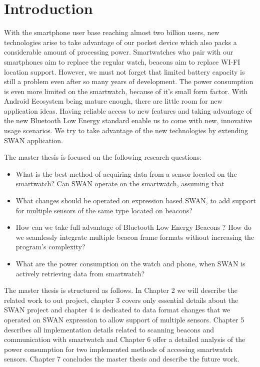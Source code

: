 
\chapter{Introduction} %

\label{Chapter1} %


With the smartphone user base reaching almost two billion users, new technologies arise to take advantage of our pocket device which also packs a considerable amount of processing power.
Smartwatches who pair with our smartphones aim to replace the regular watch, beacons aim to replace WI-FI location support. 
However, we must not forget that limited battery capacity is still a problem even after so many years of development. The power consumption is even more limited on the smartwatch, because of
it's small form factor.
With Android Ecosystem being mature enough, there are little room for new application ideas. Having reliable access to new features and taking advantage of the new Bluetooth Low Energy standard
enable us to come with new, innovative usage scenarios. We try to take advantage of the new technologies by extending SWAN application.

The master thesis is focused on the following research questions:

\begin{itemize}
 \item What is the best method of acquiring data from a sensor located on the smartwatch? Can SWAN operate on the smartwatch, assuming that 
 \item What changes should be operated on expression based SWAN, to add support for multiple sensors of the same type located on beacons?
 \item How can we take full advantage of Bluetooth Low Energy Beacons ? How do we seamlessly integrate multiple beacon frame formats without increasing the program's complexity?
 \item What are the power consumption on the watch and phone, when SWAN is actively retrieving data from smartwatch?
\end{itemize}

The master thesis is structured as follows. In Chapter 2 we will describe the related work to out project, chapter 3 covers only essential details about the SWAN project and chapter 4 is dedicated to
data format changes that we operated on SWAN expression to allow support of multiple sensors. Chapter 5 describes all implementation details related to scanning beacons and communication
with smartwatch and Chapter 6 offer a detailed analysis of the power consumption for two implemented methods of accessing smartwatch sensors. Chapter 7 concludes the master thesis and describe 
the future work.
